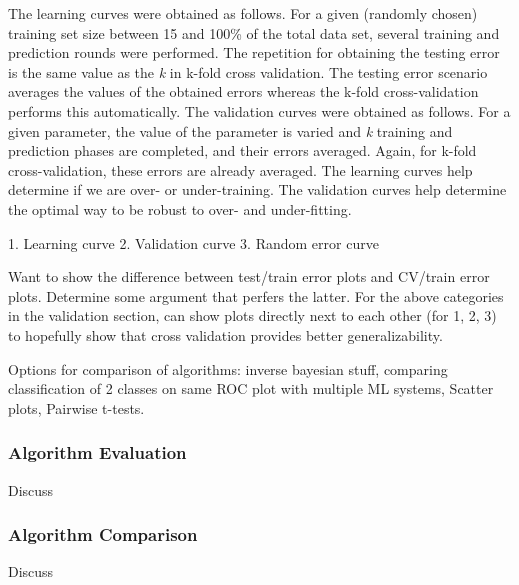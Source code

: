 The learning curves were obtained as follows. For a given (randomly chosen)
training set size between 15 and 100\% of the total data set, several training
and prediction rounds were performed. The repetition for obtaining the testing
error is the same value as the \textit{k} in k-fold cross validation. The
testing error scenario averages the values of the obtained errors whereas the
k-fold cross-validation performs this automatically.  The validation curves
were obtained as follows. For a given parameter, the value of the parameter is
varied and \textit{k} training and prediction phases are completed, and their
errors averaged. Again, for k-fold cross-validation, these errors are already
averaged. The learning curves help determine if we are over- or under-training.
The validation curves help determine the optimal way to be robust to over- and
under-fitting. 

1. Learning curve
2. Validation curve
3. Random error curve

Want to show the difference between test/train error plots and CV/train error
plots.  Determine some argument that perfers the latter. For the above
categories in the validation section, can show plots directly next to each
other (for 1, 2, 3) to hopefully show that cross validation provides better
generalizability.

Options for comparison of algorithms: inverse bayesian stuff, comparing
classification of 2 classes on same ROC plot with multiple ML systems, Scatter
plots, Pairwise t-tests.

\subsubsection{Algorithm Evaluation}
\label{sec:algeval}

Discuss

\subsubsection{Algorithm Comparison}
\label{sec:algcompare}

Discuss

